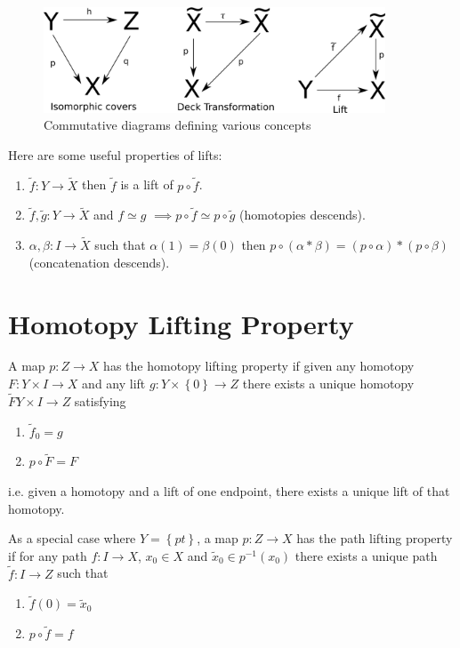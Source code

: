 \documentclass[11pt]{article}
\newenvironment{defin}
	{\begin{mdframed}[backgroundcolor=white, roundcorner=5pt, linewidth=1pt]}
	{\end{mdframed}}
\newcommand{\mdf}[1]{{\color{red} #1}}
\begin{document}
\begin{figure}[ht]
	\centering
	\includegraphics[width=4in]{basicdefs_diagrams.png}	
	\caption{Commutative diagrams defining various concepts}
\end{figure}

Here are some useful properties of lifts: 
\begin{enumerate}[label=(\roman*)]
	\item $\widetilde{f}:Y\to\widetilde{X}$ then $\widetilde{f}$ is a lift of $p\circ\widetilde{f}$.
	\item $\widetilde{f},\widetilde{g}:Y\to\widetilde{X}$ and $f\simeq g$ $\implies p\circ \widetilde{f}\simeq p\circ \widetilde{g}$ (homotopies descends).
	\item $\alpha, \beta: I \to \widetilde{X}$ such that $\alpha(1)=\beta(0)$ then $p\circ (\alpha\ast\beta)=(p\circ\alpha)\ast(p\circ\beta)$ (concatenation descends).
\end{enumerate}

\section{Homotopy Lifting Property}
\begin{defin}
	A map $p:Z\to X$ has the \mdf{homotopy lifting property} if given any homotopy $F:Y\times I \to X$ and any lift $g:Y\times\left\{0\right\}\to Z$ there exists a unique homotopy $\widetilde{F}Y\times I \to Z$ satisfying
	\begin{enumerate}[label=(\roman*)]
		\item $\widetilde{f}_0=g$
		\item $p\circ\widetilde{F}=F$
	\end{enumerate}
	i.e. given a homotopy and a lift of one endpoint, there exists a unique lift of that homotopy.

	As a special case where $Y=\left\{pt\right\}$, a map $p:Z\to X$ has the \mdf{path lifting property} if for any path $f:I\to X$, $x_0\in X$ and $\widetilde{x}_0\in p^{-1}(x_0)$ there exists a unique path $\widetilde{f}:I\to Z$ such that 
	\begin{enumerate}[label=(\roman*)]
		\item $\widetilde{f}(0)=\widetilde{x}_0$
		\item $p\circ\widetilde{f}=f$
	\end{enumerate}
\end{defin}
\end{document}
